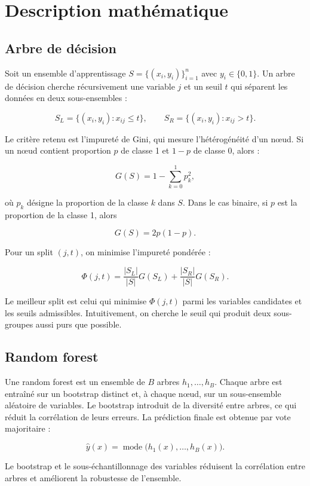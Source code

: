 \documentclass[11pt,a4paper]{article}
\begin{document}
\section{Description mathématique}

\subsection{Arbre de décision}

Soit un ensemble d'apprentissage $S = \{(x_i, y_i)\}_{i=1}^n$ avec $y_i \in \{0,1\}$. Un arbre de décision cherche récursivement une variable $j$ et un seuil $t$ qui séparent les données en deux sous-ensembles :

\[
S_L = \{(x_i, y_i) : x_{ij} \le t\}, \qquad S_R = \{(x_i, y_i) : x_{ij} > t\}.
\]

Le critère retenu est l'impureté de Gini, qui mesure l'hétérogénéité d'un nœud. Si un nœud contient proportion $p$ de classe 1 et $1-p$ de classe 0, alors :

\[
G(S) = 1 - \sum_{k=0}^{1} p_k^2,
\]

où $p_k$ désigne la proportion de la classe $k$ dans $S$. Dans le cas binaire, si $p$ est la proportion de la classe 1, alors

\[
G(S) = 2p(1-p).
\]

Pour un split $(j,t)$, on minimise l'impureté pondérée :

\[
\Phi(j,t) = \frac{|S_L|}{|S|}G(S_L) + \frac{|S_R|}{|S|}G(S_R).
\]

Le meilleur split est celui qui minimise $\Phi(j,t)$ parmi les variables candidates et les seuils admissibles. Intuitivement, on cherche le seuil qui produit deux sous-groupes aussi purs que possible.

\subsection{Random forest}

Une random forest est un ensemble de $B$ arbres $h_1,\dots,h_B$. Chaque arbre est entraîné sur un bootstrap distinct et, à chaque nœud, sur un sous-ensemble aléatoire de variables. Le bootstrap introduit de la diversité entre arbres, ce qui réduit la corrélation de leurs erreurs. La prédiction finale est obtenue par vote majoritaire :

\[
\hat{y}(x) = \operatorname{mode}\bigl(h_1(x), \dots, h_B(x)\bigr).
\]

Le bootstrap et le sous-échantillonnage des variables réduisent la corrélation entre arbres et améliorent la robustesse de l'ensemble.
\end{document}

